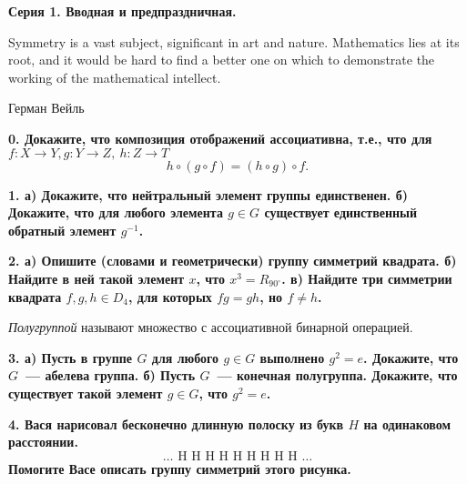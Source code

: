 \documentclass[12pt]{article}
\begin{document}
\centerline{\bf{Серия 1. Вводная и предпраздничная. }}

	\epigraph{Symmetry is a vast subject, significant in art and nature. Mathematics lies at its root, and it would be hard to find a better one on which to demonstrate the working of the mathematical intellect.}{Герман Вейль}

	\bf{0.} Докажите, что композиция отображений ассоциативна, т.е., что для $f \colon X \to Y, g \colon Y \to Z, \ h \colon Z \to T$
	\[
		h \circ (g \circ f) = (h \circ g) \circ f.
	\]

	\bf{1.} а) Докажите, что нейтральный элемент группы единственен. б) Докажите, что для любого элемента $g \in G$ существует единственный обратный элемент $g^{-1}$. 

	\bf{2.} а) Опишите (словами и геометрически) группу симметрий квадрата. б) Найдите в ней такой элемент $x$, что $x^3 = R_{90^{\circ}}$. в) Найдите три симметрии квадрата $f, g, h \in D_{4}$, для которых $fg = gh$, но $f \neq h$.

	\begin{definition} 
		\emph{Полугруппой} называют множество с ассоциативной бинарной операцией. 
	\end{definition}

	\bf{3.} а)  Пусть в группе $G$ для любого $g \in G$ выполнено $g^2 = e$. Докажите, что $G$~--- абелева группа.  б) Пусть $G$~--- конечная полугруппа. Докажите, что существует такой элемент $g \in G$, что $g^2 = e$.

	\bf{4.} Вася нарисовал бесконечно длинную полоску из букв $H$ на одинаковом расстоянии.
	\[
		\text{\ldots\  H \ H \ H \ H \ H \ H \ H \ H \ H \ldots}
	\]
	Помогите Васе описать группу симметрий этого рисунка. 



	
\end{document}
